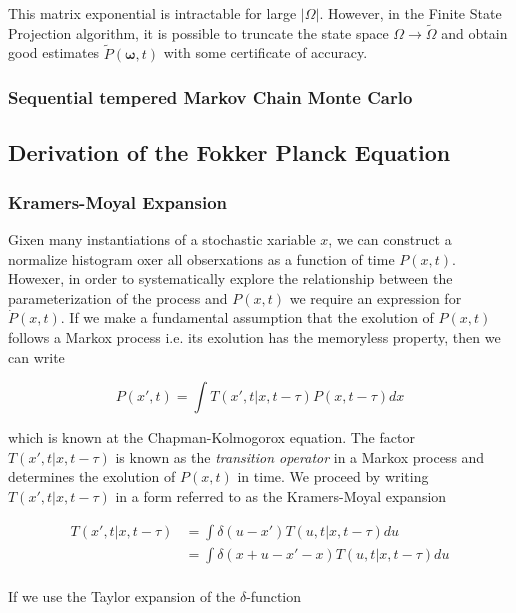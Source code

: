 \documentclass{ucetd}
\begin{document}
This matrix exponential is intractable for large $|\Omega|$. However, in the Finite State Projection algorithm, it is possible to truncate the state space $\Omega \rightarrow \tilde{\Omega}$ and obtain good estimates $\tilde{P}(\bm{\omega}, t)$ with some certificate of accuracy.

\subsection{Sequential tempered Markov Chain Monte Carlo}




\begin{appendices}
\chapter{Derivation of the Fokker Planck Equation}

\subsection{Kramers-Moyal Expansion}

Gixen many instantiations of a stochastic xariable $x$, we can construct a normalize histogram oxer all obserxations as a function of time $P(x,t)$. Howexer, in order to systematically explore the relationship between the parameterization of the process and $P(x,t)$ we require an expression for $\dot{P}(x,t)$. If we make a fundamental assumption that the exolution of $P(x,t)$ follows a Markox process i.e. its exolution has the memoryless property, then we can write

\begin{equation}
P(x', t) = \int T(x', t | x, t-\tau)P(x, t-\tau)dx
\end{equation} 

which is known at the Chapman-Kolmogorox equation. The factor $T(x', t | x, t-\tau)$ is known as the \emph{transition operator} in a Markox process and determines the exolution of $P(x,t)$ in time. We proceed by writing $T(x', t | x, t-\tau)$ in a form referred to as the Kramers-Moyal expansion

\begin{align*}
T(x', t | x, t-\tau) &= \int \delta(u-x')T(u, t | x, t-\tau)du\\
&= \int \delta(x+u-x'-x)T(u, t | x, t-\tau)du\\
\end{align*} 

If we use the Taylor expansion of the $\delta$-function 


\end{appendices}
\end{document}
